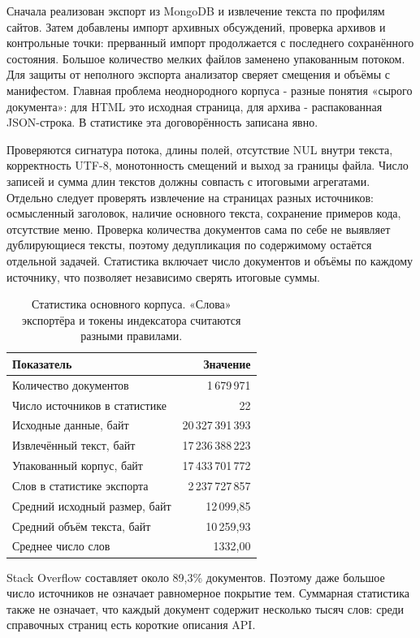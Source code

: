 \journal
Сначала реализован экспорт из MongoDB и извлечение текста по профилям
сайтов. Затем добавлены импорт архивных обсуждений, проверка архивов и
контрольные точки: прерванный импорт продолжается с последнего сохранённого
состояния. Большое количество мелких файлов заменено упакованным потоком.
Для защиты от неполного экспорта анализатор сверяет смещения и объёмы
с манифестом. Главная проблема неоднородного корпуса - разные понятия
«сырого документа»: для HTML это исходная страница, для архива -
распакованная JSON-строка. В статистике эта договорённость записана явно.

\testing
Проверяются сигнатура потока, длины полей, отсутствие NUL внутри текста,
корректность UTF-8, монотонность смещений и выход за границы файла.
Число записей и сумма длин текстов должны совпасть с итоговыми агрегатами.
Отдельно следует проверять извлечение на страницах разных источников:
осмысленный заголовок, наличие основного текста, сохранение примеров кода,
отсутствие меню. Проверка количества документов сама по себе не выявляет
дублирующиеся тексты, поэтому дедупликация по содержимому остаётся отдельной
задачей. Статистика включает число документов и объёмы
по каждому источнику, что позволяет независимо сверять итоговые суммы.

\results
\begin{table}[H]\centering
\begin{tabular}{lr}\toprule
Показатель & Значение\\\midrule
Количество документов & 1\,679\,971\\
Число источников в статистике & 22\\
Исходные данные, байт & 20\,327\,391\,393\\
Извлечённый текст, байт & 17\,236\,388\,223\\
Упакованный корпус, байт & 17\,433\,701\,772\\
Слов в статистике экспорта & 2\,237\,727\,857\\
Средний исходный размер, байт & 12\,099,85\\
Средний объём текста, байт & 10\,259,93\\
Среднее число слов & 1332,00\\\bottomrule
\end{tabular}
\caption{Статистика основного корпуса. «Слова» экспортёра и токены индексатора считаются разными правилами.}
\end{table}


Stack Overflow составляет около 89,3\% документов. Поэтому даже большое
число источников не означает равномерное покрытие тем. Суммарная статистика
также не означает, что каждый документ содержит несколько тысяч слов:
среди справочных страниц есть короткие описания API.

